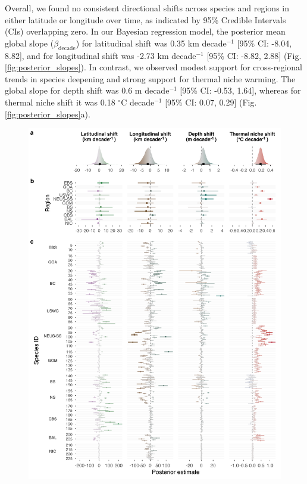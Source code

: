\documentclass[lineno,pdflatex,sn-nature]{sn-jnl}%
\begin{document}
Overall, we found no consistent directional shifts across species and regions in either latitude or longitude over time, as indicated by 95\% Credible Intervals (CIs) overlapping zero. In our Bayesian regression model, the posterior mean global slope ($\beta_{\text{decade}}$) for latitudinal shift was 0.35 km decade$^{-1}$ [95\% CI: -8.04, 8.82], and for longitudinal shift was -2.73 km decade$^{-1}$ [95\% CI: -8.82, 2.88] (Fig. \ref{fig:posterior_slopes}). In contrast, we observed modest support for cross-regional trends in species deepening and strong support for thermal niche warming. The global slope for depth shift was 0.6 m decade$^{-1}$ [95\% CI: -0.53, 1.64], whereas for thermal niche shift it was 0.18 $^{\circ}$C decade$^{-1}$ [95\% CI: 0.07, 0.29] (Fig. \ref{fig:posterior_slopes}a).

\begin{figure}[h]
\centering
\includegraphics[width=1\textwidth]{output/figures/main/posterior_slopes.png}

\end{figure}
\end{document}
